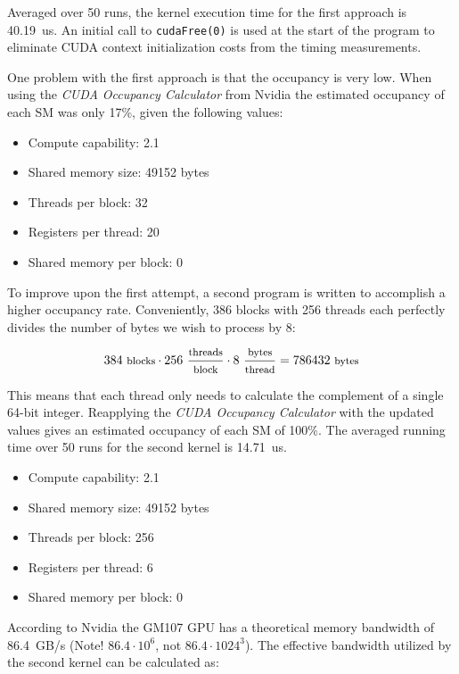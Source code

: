 \begin{enumerate}
Averaged over 50 runs, the kernel execution time for the first approach is 40.19~us. An initial call to \texttt{cudaFree(0)} is used at the start of the program to eliminate \ac{CUDA} context initialization costs from the timing measurements.

One problem with the first approach is that the occupancy is very low. When using the \textit{CUDA Occupancy Calculator} from Nvidia the estimated occupancy of each \ac{SM} was only 17\%, given the following values:

\begin{itemize}
\item Compute capability: 2.1
\item Shared memory size: 49152 bytes
\item Threads per block: 32
\item Registers per thread: 20
\item Shared memory per block: 0
\end{itemize}

To improve upon the first attempt, a second program is written to accomplish a higher occupancy rate. Conveniently, 386 blocks with 256 threads each perfectly divides the number of bytes we wish to process by 8:

\begin{displaymath}
384~\text{\footnotesize blocks} \cdot 256~\frac{\text{\footnotesize threads}}{\text{\footnotesize block}} \cdot 8~\frac{\text{\footnotesize bytes}}{\text{\footnotesize thread}} = 786432~\text{\footnotesize bytes}
\end{displaymath}

This means that each thread only needs to calculate the complement of a single 64-bit integer. Reapplying the \textit{CUDA Occupancy Calculator} with the updated values gives an estimated occupancy of each \ac{SM} of 100\%. The averaged running time over 50 runs for the second kernel is 14.71~us.

\begin{itemize}
\item Compute capability: 2.1
\item Shared memory size: 49152 bytes
\item Threads per block: 256
\item Registers per thread: 6
\item Shared memory per block: 0
\end{itemize}

According to Nvidia the GM107 \ac{GPU} has a theoretical memory bandwidth of 86.4~GB/s (Note! $86.4 \cdot 10^6$, not $86.4 \cdot 1024^3$). The effective bandwidth utilized by the second kernel can be calculated as:


\end{enumerate}
